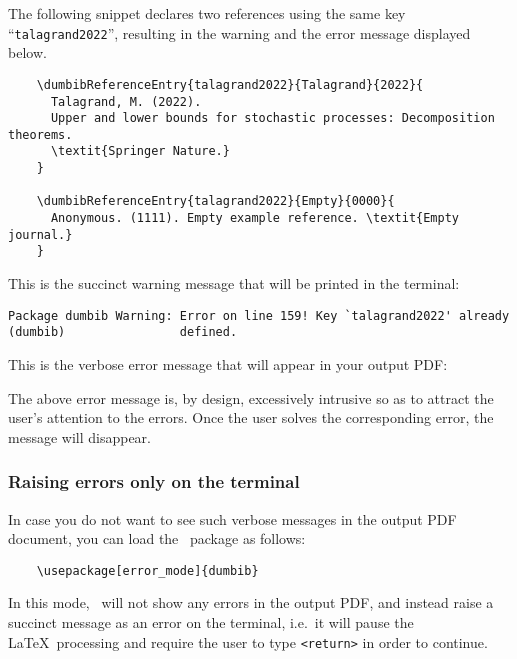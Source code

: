\documentclass[letter, 11pt]{article}
\begin{document}
  The following snippet declares two references using the same key ``\texttt{talagrand2022}'', resulting in the warning and the error message displayed below.
  \begin{verbatim}
    \dumbibReferenceEntry{talagrand2022}{Talagrand}{2022}{
      Talagrand, M. (2022).
      Upper and lower bounds for stochastic processes: Decomposition theorems.
      \textit{Springer Nature.}
    }
    
    \dumbibReferenceEntry{talagrand2022}{Empty}{0000}{
      Anonymous. (1111). Empty example reference. \textit{Empty journal.}
    }
  \end{verbatim}
  This is the succinct warning message that will be printed in the terminal:
\begin{verbatim}
Package dumbib Warning: Error on line 159! Key `talagrand2022' already
(dumbib)                defined.
\end{verbatim}
  This is the verbose error message that will appear in your output PDF:
  
  
  The above error message is, by design, excessively intrusive so as to attract the user's attention to the errors. Once the user solves the corresponding error, the message will disappear.

  \subsubsection*{Raising errors only on the terminal}
  In case you do not want to see such verbose messages in the output PDF document, you can load the \dumbib\ package as follows:
  \begin{verbatim}
    \usepackage[error_mode]{dumbib}
  \end{verbatim}
  In this mode, \dumbib\ will not show any errors in the output PDF, and instead raise a succinct message as an error on the terminal, i.e.\ it will pause the \LaTeX\ processing and require the user to type \texttt{<return>} in order to continue.
\end{document}
